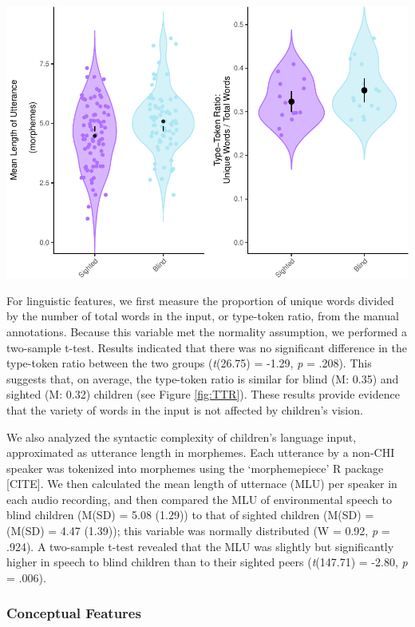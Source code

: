 \documentclass[
  man,floatsintext]{apa6}
\begin{document}
\includegraphics{input_quality_manuscript_files/figure-latex/linguistic-plots-1.pdf}

For linguistic features, we first measure the proportion of unique words divided by the number of total words in the input, or type-token ratio, from the manual annotations. Because this variable met the normality assumption, we performed a two-sample t-test. Results indicated that there was no significant difference in the type-token ratio between the two groups (\emph{t}(26.75) = -1.29, \emph{p} = .208). This suggests that, on average, the type-token ratio is similar for blind (M: 0.35) and sighted (M: 0.32) children (see Figure \ref{fig:TTR}). These results provide evidence that the variety of words in the input is not affected by children's vision.

We also analyzed the syntactic complexity of children's language input, approximated as utterance length in morphemes. Each utterance by a non-CHI speaker was tokenized into morphemes using the `morphemepiece' R package {[}CITE{]}. We then calculated the mean length of utternace (MLU) per speaker in each audio recording, and then compared the MLU of environmental speech to blind children (M(SD) = 5.08 (1.29)) to that of sighted children (M(SD) = (M(SD) = 4.47 (1.39)); this variable was normally distributed (W = 0.92, \emph{p} = .924). A two-sample t-test revealed that the MLU was slightly but significantly higher in speech to blind children than to their sighted peers (\emph{t}(147.71) = -2.80, \emph{p} = .006).

\hypertarget{conceptual-features}{%
\subsubsection{Conceptual Features}\label{conceptual-features}}
\end{document}
